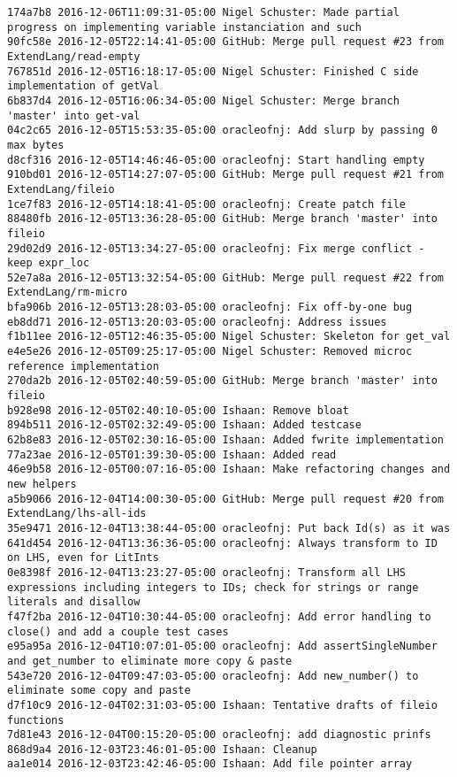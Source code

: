\begin{lstlisting}
174a7b8 2016-12-06T11:09:31-05:00 Nigel Schuster: Made partial progress on implementing variable instanciation and such
90fc58e 2016-12-05T22:14:41-05:00 GitHub: Merge pull request #23 from ExtendLang/read-empty
767851d 2016-12-05T16:18:17-05:00 Nigel Schuster: Finished C side implementation of getVal
6b837d4 2016-12-05T16:06:34-05:00 Nigel Schuster: Merge branch 'master' into get-val
04c2c65 2016-12-05T15:53:35-05:00 oracleofnj: Add slurp by passing 0 max bytes
d8cf316 2016-12-05T14:46:46-05:00 oracleofnj: Start handling empty
910bd01 2016-12-05T14:27:07-05:00 GitHub: Merge pull request #21 from ExtendLang/fileio
1ce7f83 2016-12-05T14:18:41-05:00 oracleofnj: Create patch file
88480fb 2016-12-05T13:36:28-05:00 GitHub: Merge branch 'master' into fileio
29d02d9 2016-12-05T13:34:27-05:00 oracleofnj: Fix merge conflict - keep expr_loc
52e7a8a 2016-12-05T13:32:54-05:00 GitHub: Merge pull request #22 from ExtendLang/rm-micro
bfa906b 2016-12-05T13:28:03-05:00 oracleofnj: Fix off-by-one bug
eb8dd71 2016-12-05T13:20:03-05:00 oracleofnj: Address issues
f1b11ee 2016-12-05T12:46:35-05:00 Nigel Schuster: Skeleton for get_val
e4e5e26 2016-12-05T09:25:17-05:00 Nigel Schuster: Removed microc reference implementation
270da2b 2016-12-05T02:40:59-05:00 GitHub: Merge branch 'master' into fileio
b928e98 2016-12-05T02:40:10-05:00 Ishaan: Remove bloat
894b511 2016-12-05T02:32:49-05:00 Ishaan: Added testcase
62b8e83 2016-12-05T02:30:16-05:00 Ishaan: Added fwrite implementation
77a23ae 2016-12-05T01:39:30-05:00 Ishaan: Added read
46e9b58 2016-12-05T00:07:16-05:00 Ishaan: Make refactoring changes and new helpers
a5b9066 2016-12-04T14:00:30-05:00 GitHub: Merge pull request #20 from ExtendLang/lhs-all-ids
35e9471 2016-12-04T13:38:44-05:00 oracleofnj: Put back Id(s) as it was
641d454 2016-12-04T13:36:36-05:00 oracleofnj: Always transform to ID on LHS, even for LitInts
0e8398f 2016-12-04T13:23:27-05:00 oracleofnj: Transform all LHS expressions including integers to IDs; check for strings or range literals and disallow
f47f2ba 2016-12-04T10:30:44-05:00 oracleofnj: Add error handling to close() and add a couple test cases
e95a95a 2016-12-04T10:07:01-05:00 oracleofnj: Add assertSingleNumber and get_number to eliminate more copy & paste
543e720 2016-12-04T09:47:03-05:00 oracleofnj: Add new_number() to eliminate some copy and paste
d7f10c9 2016-12-04T02:31:03-05:00 Ishaan: Tentative drafts of fileio functions
7d81e43 2016-12-04T00:15:20-05:00 oracleofnj: add diagnostic prinfs
868d9a4 2016-12-03T23:46:01-05:00 Ishaan: Cleanup
aa1e014 2016-12-03T23:42:46-05:00 Ishaan: Add file pointer array

\end{lstlisting}

